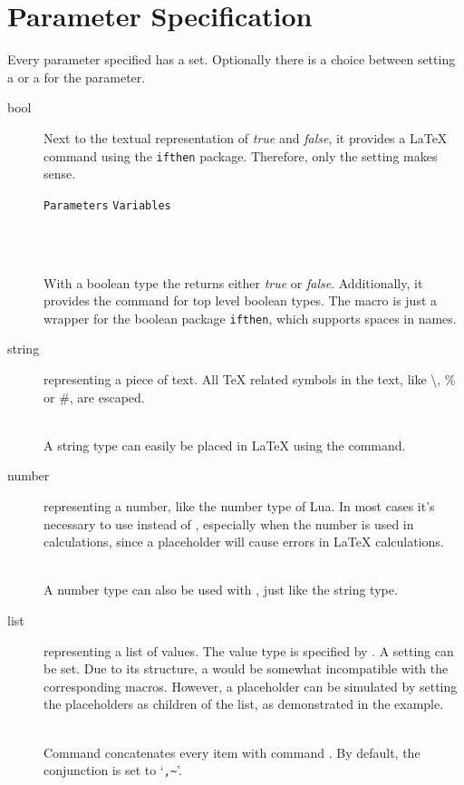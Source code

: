 \documentclass{ltxdoc}
\newcommand\showexample[5][15pt]{%
\begin{minipage}[t]{.5\linewidth - .5 \columnsep}%

\end{minipage}\hspace*{\columnsep}%
\begin{minipage}[t]{.5\linewidth - .5 \columnsep}%

\end{minipage}\\%
}
\begin{document}
    \section{Parameter Specification}
    Every parameter specified has a  set.
    Optionally there is a choice between setting a  or a  for the parameter.
    \begin{description}
        \item[bool] Next to the textual representation of \textit{true} and \textit{false}, it provides a \LaTeX{} command using the \texttt{ifthen} package.
        Therefore, only the  setting makes sense.\\[5pt]
        \hspace*{5pt}\parbox{\linewidth-5pt}{%
            \hfill\texttt{Parameters}\hfill\hspace*{\columnsep}%
            \hfill\texttt{Variables}\hfill\hspace*{\columnsep}}\\%
        \showexample{1}{1-3}{1}{1-1}
        \DescribeMacro{\param}
        With a boolean type the \cmd{\param} returns either \textit{true} or \textit{false}.
        \DescribeMacro{\ifparam}
        Additionally, it provides the \cmd{\ifparam} command for top level boolean types.
        The macro is just a wrapper for the boolean package \texttt{ifthen}, which supports spaces in names.
        \item[string] representing a piece of text.
        All \TeX{} related symbols in the text, like \textbackslash, \% or \#, are escaped.\\
        \showexample{4}{4-6}{2}{2-2}
        \DescribeMacro{\param} A string type can easily be placed in \LaTeX{} using the \cmd{\param} command.
        \item[number] representing a number, like the number type of Lua.
        In most cases it's necessary to use  instead of , especially when the number is used in calculations, since a placeholder will cause errors in \LaTeX{} calculations.\\
        \showexample{7}{7-9}{3}{3-3}
        A number type can also be used with \cmd{\param}, just like the string type.
        \item[list] representing a list of values.
        The value type is specified by .
        A  setting can be set.
        Due to its structure, a  would be somewhat incompatible with the corresponding macros.
        However, a placeholder can be simulated by setting the placeholders as children of the  list, as demonstrated in the example.\\
        \showexample{10}{10-15}{4}{4-6}
        \DescribeMacro{\param}
        Command \cmd{\param} concatenates every item with command \cmd{\paramlistconjunction}.
        \DescribeMacro{\paramlistconjunction}
        By default, the conjunction is set to `\texttt{,\textasciitilde}'.


\end{description}
\end{document}
